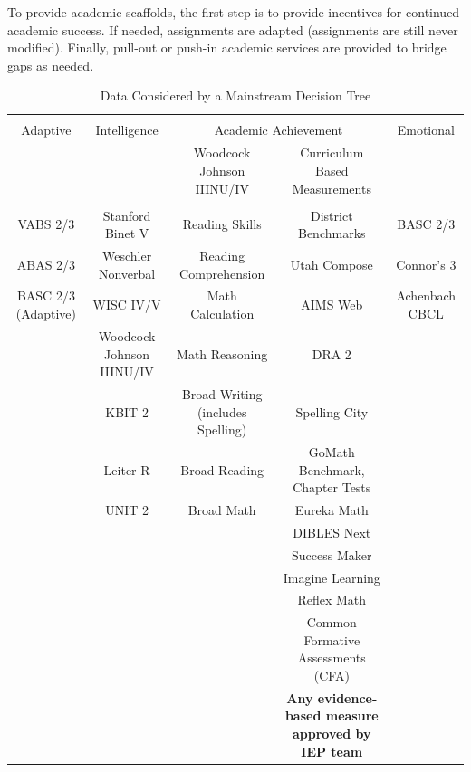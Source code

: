 \documentclass[twoside]{article}
\begin{document}
To provide academic scaffolds, the first step is to provide incentives for continued academic success. If needed, assignments are adapted (assignments are still never modified). Finally, pull-out or push-in academic services are provided to bridge gaps as needed.
%
%
%
%
\begin{table}[tbp]
\centering
\vspace*{0cm}\caption{Data Considered by a Mainstream Decision Tree}
\label{tab1}
\resizebox{\textwidth}{!}
{\begin{tabular}{ccccc}
\hline\\[-1.5ex]
Adaptive & Intelligence & \multicolumn{2}{c}{Academic Achievement} & Emotional \\[0.5ex]
\cmidrule(lr){3-4}
 & & Woodcock Johnson IIINU/IV & Curriculum Based Measurements & \\
\hline\\[-1.5ex]
VABS 2/3 & Stanford Binet V & Reading Skills & District Benchmarks & BASC 2/3\\
ABAS 2/3 & Weschler Nonverbal & Reading Comprehension & Utah Compose & Connor's 3\\
BASC 2/3 (Adaptive) & WISC IV/V & Math Calculation & AIMS Web & Achenbach CBCL\\
 & Woodcock Johnson IIINU/IV & Math Reasoning & DRA 2 & \\
 & KBIT 2 & Broad Writing (includes Spelling) & Spelling City & \\
 & Leiter R & Broad Reading & GoMath Benchmark, Chapter Tests & \\
 & UNIT 2 & Broad Math & Eureka Math &\\
 & & & DIBLES Next &\\
 & & & Success Maker &\\
 & & & Imagine Learning &\\
 & & & Reflex Math &\\
 & & & Common Formative Assessments (CFA) &\\
 & & & \textbf{Any evidence-based measure approved by IEP team} &\\
\hline
\end{tabular}}
\end{table}
%
%
%
%
%
%
%
\end{document}
